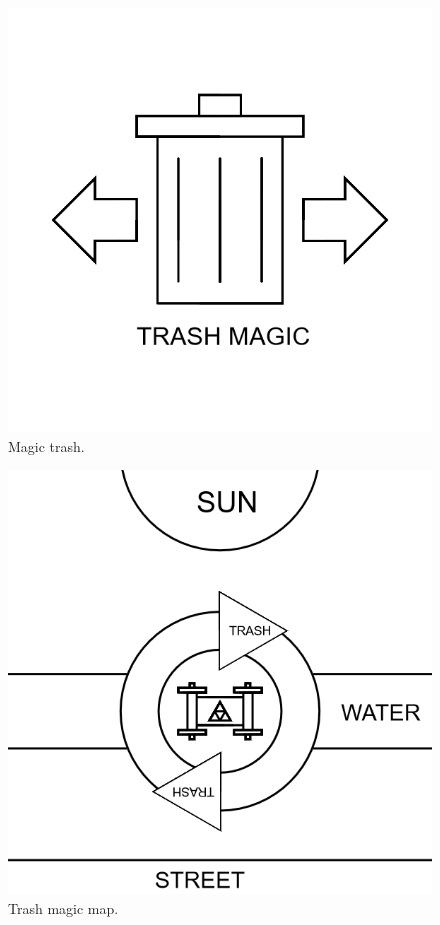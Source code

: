 \documentclass{report}
\begin{document}
\begin{figure}
	\centering
	\includegraphics[width=5in]{imageserver/uploadimages/image13.png}
	\caption{Magic trash.}
\end{figure}

\begin{figure}
	\centering
	\includegraphics[width=5in]{imageserver/uploadimages/image14.png}
	\caption{Trash magic map.}
\end{figure}
\end{document}
